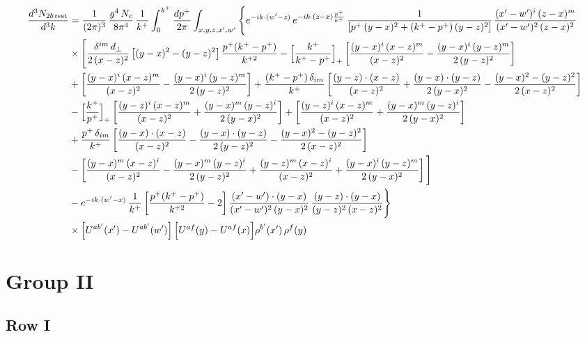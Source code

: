 \documentclass[9pt]{article}
\numberwithin{equation}{section}
\begin{document}
\begin{align}
\frac{d^{3}N_{2b\,\rm rest}}{d^{3}k} & =\frac{1}{(2\pi)^{3}}\,\frac{g^{4}\,N_{c}}{8\pi^{4}}\,\frac{1}{k^{+}}\int_{0}^{k^{+}}\frac{dp^{+}}{2\pi}\int_{x,y,z,x',w'}\Bigg\{e^{-ik\cdot(w'-z)}\,e^{-ik\cdot(z-x)\frac{p^{+}}{k^{+}}}\,\frac{1}{\left[p^{+}\,(y-x)^{2}+(k^{+}-p^{+})\,(y-z)^{2}\right]}\,\frac{(x'-w')^{i}\,(z-x)^{m}}{(x'-w')^{2}\,(z-x)^{2}}\notag\\
&\times\Bigg[\frac{\delta^{im}\,d_{\perp}}{2\,(x-z)^{2}}\left[(y-x)^{2}-(y-z)^{2}\right]\frac{p^{+}(k^{+}-p^{+})}{k^{+2}}
-\Big[\frac{k^{+}}{k^{+}-p^{+}}\Big]_{+}\left[\frac{(y-x)^{i}\,(x-z)^{m}}{(x-z)^{2}}-\frac{(y-x)^{i}\,(y-z)^{m}}{2\,(y-z)^{2}}\right]\notag\\
&+\left[\frac{(y-x)^{i}\,(x-z)^{m}}{(x-z)^{2}}-\frac{(y-x)^{i}\,(y-z)^{m}}{2\,(y-z)^{2}}\right]
+\frac{(k^{+}-p^{+})\,\delta_{im}}{k^{+}}\left[\frac{(y-z)\cdot(x-z)}{(x-z)^{2}}+\frac{(y-x)\cdot(y-z)}{2\,(y-x)^{2}}-\frac{(y-x)^{2}-(y-z)^{2}}{2\,(x-z)^{2}}\right]\notag\\
&-\Big[\frac{k^{+}}{p^{+}}\Big]_{+}\left[\frac{(y-z)^{i}\,(x-z)^{m}}{(x-z)^{2}}+\frac{(y-x)^{m}\,(y-z)^{i}}{2\,(y-x)^{2}}\right]+\left[\frac{(y-z)^{i}\,(x-z)^{m}}{(x-z)^{2}}+\frac{(y-x)^{m}\,(y-z)^{i}}{2\,(y-x)^{2}}\right]\notag\\
&+\frac{p^{+}\,\delta_{im}}{k^{+}}\left[\frac{(y-x)\cdot(x-z)}{(x-z)^{2}}-\frac{(y-x)\cdot(y-z)}{2\,(y-z)^{2}}-\frac{(y-x)^{2}-(y-z)^{2}}{2\,(x-z)^{2}}\right]\notag\\
&-\left[\frac{(y-x)^{m}\,(x-z)^{i}}{(x-z)^{2}}-\frac{(y-x)^{m}\,(y-z)^{i}}{2\,(y-z)^{2}}+\frac{(y-z)^{m}\,(x-z)^{i}}{(x-z)^{2}}+\frac{(y-x)^{i}\,(y-z)^{m}}{2\,(y-x)^{2}}\right]\Bigg]\notag\\
&-e^{-ik\cdot(w'-x)}\,\frac{1}{k^{+}}\left[\frac{p^{+}(k^{+}-p^{+})}{k^{+2}}-2\right]\frac{(x'-w')\cdot(y-x)}{(x'-w')^{2}\,(y-x)^{2}}\,\frac{(y-z)\cdot(y-x)}{(y-z)^{2}\,(x-z)^{2}}\Bigg\}\notag\\
&\times\Big[U^{ab'}(x')-U^{ab'}(w')\Big]\,\Big[U^{af}(y)-U^{af}(x)\Big]\rho^{b'}(x')\,\rho^{f}(y)
\end{align}

\section{Group II}
\subsection{Row I}
\end{document}
